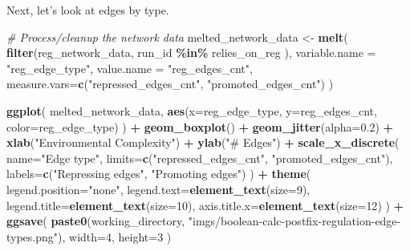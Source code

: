 \documentclass[
]{book}
\newenvironment{Shaded}{\begin{snugshade}}{\end{snugshade}}
\newcommand{\CommentTok}[1]{\textcolor[rgb]{0.56,0.35,0.01}{\textit{#1}}}
\newcommand{\DataTypeTok}[1]{\textcolor[rgb]{0.13,0.29,0.53}{#1}}
\newcommand{\DecValTok}[1]{\textcolor[rgb]{0.00,0.00,0.81}{#1}}
\newcommand{\FloatTok}[1]{\textcolor[rgb]{0.00,0.00,0.81}{#1}}
\newcommand{\KeywordTok}[1]{\textcolor[rgb]{0.13,0.29,0.53}{\textbf{#1}}}
\newcommand{\NormalTok}[1]{#1}
\newcommand{\OperatorTok}[1]{\textcolor[rgb]{0.81,0.36,0.00}{\textbf{#1}}}
\newcommand{\StringTok}[1]{\textcolor[rgb]{0.31,0.60,0.02}{#1}}
\begin{document}
Next, let's look at edges by type.

\begin{Shaded}
\begin{Highlighting}[]
\CommentTok{\# Process/cleanup the network data}
\NormalTok{melted\_network\_data \textless{}{-}}\StringTok{ }\KeywordTok{melt}\NormalTok{(}
  \KeywordTok{filter}\NormalTok{(reg\_network\_data,}
\NormalTok{         run\_id }\OperatorTok{\%in\%}\StringTok{ }\NormalTok{relies\_on\_reg}
\NormalTok{        ),}
  \DataTypeTok{variable.name =} \StringTok{"reg\_edge\_type"}\NormalTok{,}
  \DataTypeTok{value.name =} \StringTok{"reg\_edges\_cnt"}\NormalTok{,}
  \DataTypeTok{measure.vars=}\KeywordTok{c}\NormalTok{(}\StringTok{"repressed\_edges\_cnt"}\NormalTok{, }\StringTok{"promoted\_edges\_cnt"}\NormalTok{)}
\NormalTok{)}

\KeywordTok{ggplot}\NormalTok{( melted\_network\_data, }\KeywordTok{aes}\NormalTok{(}\DataTypeTok{x=}\NormalTok{reg\_edge\_type, }\DataTypeTok{y=}\NormalTok{reg\_edges\_cnt, }\DataTypeTok{color=}\NormalTok{reg\_edge\_type) ) }\OperatorTok{+}
\StringTok{  }\KeywordTok{geom\_boxplot}\NormalTok{() }\OperatorTok{+}
\StringTok{  }\KeywordTok{geom\_jitter}\NormalTok{(}\DataTypeTok{alpha=}\FloatTok{0.2}\NormalTok{) }\OperatorTok{+}
\StringTok{  }\KeywordTok{xlab}\NormalTok{(}\StringTok{"Environmental Complexity"}\NormalTok{) }\OperatorTok{+}
\StringTok{  }\KeywordTok{ylab}\NormalTok{(}\StringTok{"\# Edges"}\NormalTok{) }\OperatorTok{+}
\StringTok{  }\KeywordTok{scale\_x\_discrete}\NormalTok{(}
    \DataTypeTok{name=}\StringTok{"Edge type"}\NormalTok{,}
    \DataTypeTok{limits=}\KeywordTok{c}\NormalTok{(}\StringTok{"repressed\_edges\_cnt"}\NormalTok{, }\StringTok{"promoted\_edges\_cnt"}\NormalTok{),}
    \DataTypeTok{labels=}\KeywordTok{c}\NormalTok{(}\StringTok{"Repressing edges"}\NormalTok{, }\StringTok{"Promoting edges"}\NormalTok{)}
\NormalTok{  ) }\OperatorTok{+}
\StringTok{  }\KeywordTok{theme}\NormalTok{(}
    \DataTypeTok{legend.position=}\StringTok{"none"}\NormalTok{,}
    \DataTypeTok{legend.text=}\KeywordTok{element\_text}\NormalTok{(}\DataTypeTok{size=}\DecValTok{9}\NormalTok{),}
    \DataTypeTok{legend.title=}\KeywordTok{element\_text}\NormalTok{(}\DataTypeTok{size=}\DecValTok{10}\NormalTok{),}
    \DataTypeTok{axis.title.x=}\KeywordTok{element\_text}\NormalTok{(}\DataTypeTok{size=}\DecValTok{12}\NormalTok{)}
\NormalTok{  ) }\OperatorTok{+}
\StringTok{  }\KeywordTok{ggsave}\NormalTok{(}
    \KeywordTok{paste0}\NormalTok{(working\_directory, }\StringTok{"imgs/boolean{-}calc{-}postfix{-}regulation{-}edge{-}types.png"}\NormalTok{),}
    \DataTypeTok{width=}\DecValTok{4}\NormalTok{,}
    \DataTypeTok{height=}\DecValTok{3}
\NormalTok{  )}
\end{Highlighting}
\end{Shaded}
\end{document}
